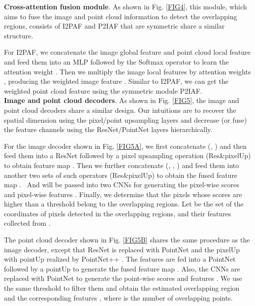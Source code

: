 \documentclass[lettersize,journal]{IEEEtran}
\begin{document}
\noindent\textbf{Cross-attention fusion module}. As shown in Fig. \ref{FIG4}, this module, which aims to fuse the image and point cloud information to detect the overlapping regions, consists of I2PAF and P2IAF that are symmetric share a similar structure. 

For I2PAF, we concatenate the image global feature  and point cloud local feature  and feed them into an MLP followed by the Softmax operator to learn the attention weight . Then we multiply the image local features  by attention weights , producing the weighted image feature . Similar to I2PAF, we can get the weighted point cloud feature  using the symmetric module P2IAF.\\



\noindent\textbf{Image and point cloud decoders}. As shown in Fig. \ref{FIG5}, the image and point cloud decoders share a similar design.  Our intuitions are to recover the spatial dimension using the pixel/point upsampling layers and decrease (or fuse) the feature channels using the ResNet/PointNet layers hierarchically.



For the image decoder shown in Fig. \ref{FIG5A}, we first concatenate (, ) and then feed them into a ResNet followed by a pixel upsampling operation (Res\&pixelUp) to obtain  feature map . Then we further concatenate (, , ) and feed them into another two sets of such operators (Res\&pixelUp) to obtain the fused feature map . \ And  will be passed into two CNNs for generating the pixel-wise scores  and pixel-wise features . 
Finally, we determine that the pixels whose scores are higher than a threshold  belong to the overlapping regions. Let  be the set of the coordinates of  pixels detected in the overlapping regions, and  their features collected from .  






The point cloud decoder shown in Fig. \ref{FIG5B} shares the same procedure as the image decoder, except that ResNet is replaced with PointNet and the pixelUp with pointUp realized by PointNet++ \cite{POINTNET2}. 
The features are fed into a PointNet followed by a pointUp to generate the fused feature map . Also, the CNNs are replaced with PointNet to generate the point-wise scores  and features . We use the same threshold  to filter them and obtain the estimated overlapping region  and the corresponding features , where  is the number of overlapping points.
\end{document}
